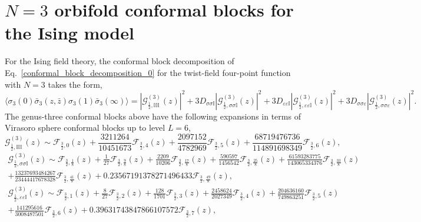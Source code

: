 \documentclass[a4paper,11pt]{article}
\begin{document}
\section{$N=3$ orbifold conformal blocks for the Ising model}\label{app_ising}

For the Ising field theory, the conformal block decomposition of 
Eq.~\eqref{conformal_block_decomposition_0} for the twist-field 
four-point function with $N=3$ takes the form,
\begin{equation}
 \langle \sigma_3(0)\bar{\sigma}_3(z, \bar{z})\sigma_3(1)\bar{\sigma}_3(\infty)\rangle=
 |\mathcal{G}_{\frac{1}{2},\mathbb{I}\mathbb{I}\mathbb{I}}^{(3)}(z)|^2+
 3D_{\sigma\sigma\mathbb{I}}|\mathcal{G}_{\frac{1}{2},\sigma\sigma\mathbb{I}}^{(3)}(z)|^2+
 3D_{\varepsilon\varepsilon\mathbb{I}}|\mathcal{G}_{\frac{1}{2},\varepsilon\varepsilon\mathbb{I}}^{(3)}(z)|^2+
 3D_{\sigma\sigma\varepsilon}|\mathcal{G}_{\frac{1}{2},\sigma\sigma\varepsilon}^{(3)}(z)|^2.
\end{equation}
The genus-three conformal blocks above have the following 
expansions in terms of Virasoro sphere conformal blocks up to level $L=6$,
\begin{equation}
 \mathcal{G}_{\frac{1}{2},\mathbb{I}\mathbb{I}\mathbb{I}}^{(3)}(z)\sim
 \mathcal{F}_{\frac{3}{2}, 0}(z) + 
 \frac{3211264}{10451673} \mathcal{F}_{\frac{3}{2}, 4}(z) + 
 \frac{2097152}{4782969} \mathcal{F}_{\frac{3}{2}, 5}(z) + 
 \frac{68719476736}{114891698349}\mathcal{F}_{\frac{3}{2}, 6}(z),
\end{equation}
\begin{multline}
 \mathcal{G}_{\frac{1}{2},\sigma\sigma\mathbb{I}}^{(3)}(z)\sim
 \mathcal{F}_{\frac{3}{2},\frac{1}{8}}(z) + 
 \frac{1}{27} \mathcal{F}_{\frac{3}{2}, \frac{9}{8}}(z) + 
 \frac{2209}{10206} \mathcal{F}_{\frac{3}{2}, \frac{17}{8}}(z) + 
 \frac{590597}{1456542} \mathcal{F}_{\frac{3}{2}, \frac{25}{8}}(z) + 
 \frac{61593283775}{143065334376}\mathcal{F}_{\frac{3}{2}, \frac{33}{8}}(z) \\ + 
 \frac{13237693484267}{23444417678328}\mathcal{F}_{\frac{3}{2}, \frac{41}{8}}(z) + 
 0.23567191378271496433 \mathcal{F}_{\frac{3}{2}, \frac{49}{8}}(z),
\end{multline}
\begin{multline}
 \mathcal{G}_{\frac{1}{2},\varepsilon\varepsilon\mathbb{I}}^{(3)}(z)\sim
 \mathcal{F}_{\frac{3}{2}, 1}(z)+ 
 \frac{8}{27} \mathcal{F}_{\frac{3}{2}, 2}(z)+ 
 \frac{128}{1701}\mathcal{F}_{\frac{3}{2}, 3}(z) + 
 \frac{2458624}{2027349}\mathcal{F}_{\frac{3}{2}, 4}(z) + 
 \frac{204636160}{749863251}\mathcal{F}_{\frac{3}{2}, 5}(z) \\+ 
 \frac{141295616}{3008487501}\mathcal{F}_{\frac{3}{2},6}(z) + 
 0.39631743847866107572\mathcal{F}_{\frac{3}{2}, 7}(z),
\end{multline}
\end{document}
